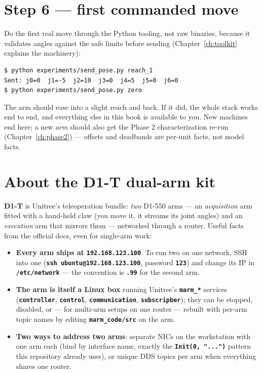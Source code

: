 \documentclass[11pt,twoside,openright]{book}
\newcommand{\code}[1]{\texttt{\bfseries #1}}
\begin{document}
\section{Step 6 --- first commanded move}

Do the first real move through the Python tooling, not raw binaries,
because it validates angles against the safe limits before sending
(Chapter~\ref{ch:toolkit} explains the machinery):

\begin{lstlisting}
$ python experiments/send_pose.py reach_1
Sent: j0=0  j1=-5  j2=10  j3=0  j4=5  j5=0  j6=0
$ python experiments/send_pose.py zero
\end{lstlisting}

The arm should ease into a slight reach and back. If it did, the whole
stack works end to end, and everything else in this book is available to
you. New machines end here; a new \emph{arm} should also get the Phase 2
characterization re-run (Chapter~\ref{ch:phase2}) --- offsets and
deadbands are per-unit facts, not model facts.

\section{About the D1-T dual-arm kit}

\textbf{D1-T} is Unitree's teleoperation bundle: \emph{two} D1-550 arms
--- an \emph{acquisition} arm fitted with a hand-held claw (you move it,
it streams its joint angles) and an \emph{execution} arm that mirrors
them --- networked through a router. Useful facts from the official docs,
even for single-arm work:

\begin{itemize}
  \item \textbf{Every arm ships at} \code{192.168.123.100}. To run two
    on one network, SSH into one (\code{ssh ubuntu@192.168.123.100},
    password \code{123}) and change its IP in \code{/etc/network} ---
    the convention is \code{.99} for the second arm.
  \item \textbf{The arm is itself a Linux box} running Unitree's
    \code{marm\_*} services (\code{controller}, \code{control},
    \code{communication}, \code{subscripber}); they can be stopped,
    disabled, or --- for multi-arm setups on one router --- rebuilt with
    per-arm topic names by editing \code{marm\_code/src} on the arm.
  \item \textbf{Two ways to address two arms}: separate NICs on the
    workstation with one arm each (bind by interface name, exactly the
    \code{Init(0, "...")} pattern this repository already uses), or
    unique DDS topics per arm when everything shares one router.
\end{itemize}
\end{document}
